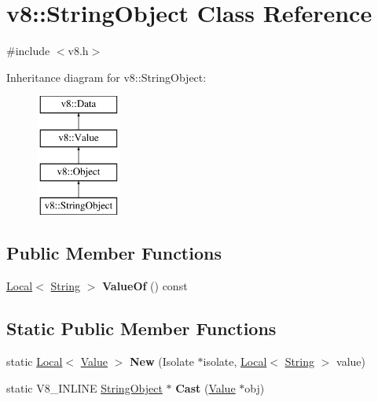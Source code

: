 \hypertarget{classv8_1_1StringObject}{}\section{v8\+:\+:String\+Object Class Reference}
\label{classv8_1_1StringObject}


{\ttfamily \#include $<$v8.\+h$>$}

Inheritance diagram for v8\+:\+:String\+Object\+:\begin{figure}[H]
\begin{center}
\leavevmode
\includegraphics[height=4.000000cm]{classv8_1_1StringObject}
\end{center}
\end{figure}
\subsection*{Public Member Functions}
\begin{DoxyCompactItemize}
\item 
\mbox{\label{classv8_1_1StringObject_a728454fbe6e41dc3af72de0f72ffe371}} 
\mbox{\hyperlink{classv8_1_1Local}{Local}}$<$ \mbox{\hyperlink{classv8_1_1String}{String}} $>$ {\bfseries Value\+Of} () const
\end{DoxyCompactItemize}
\subsection*{Static Public Member Functions}
\begin{DoxyCompactItemize}
\item 
\mbox{\label{classv8_1_1StringObject_a850b39ef363a85cd409dc31cd8ae7cfd}} 
static \mbox{\hyperlink{classv8_1_1Local}{Local}}$<$ \mbox{\hyperlink{classv8_1_1Value}{Value}} $>$ {\bfseries New} (Isolate $\ast$isolate, \mbox{\hyperlink{classv8_1_1Local}{Local}}$<$ \mbox{\hyperlink{classv8_1_1String}{String}} $>$ value)
\item 
\mbox{\label{classv8_1_1StringObject_af01249353a4a9032f7791a6e7a4ff094}} 
static V8\+\_\+\+I\+N\+L\+I\+NE \mbox{\hyperlink{classv8_1_1StringObject}{String\+Object}} $\ast$ {\bfseries Cast} (\mbox{\hyperlink{classv8_1_1Value}{Value}} $\ast$obj)
\end{DoxyCompactItemize}


